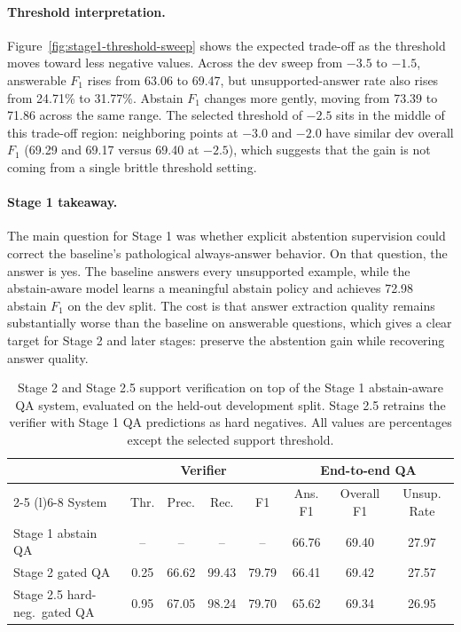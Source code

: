 \paragraph{Threshold interpretation.}
Figure~\ref{fig:stage1-threshold-sweep} shows the expected trade-off as the
threshold moves toward less negative values.
Across the dev sweep from $-3.5$ to $-1.5$, answerable $F_1$ rises from 63.06
to 69.47, but unsupported-answer rate also rises from 24.71\% to 31.77\%.
Abstain $F_1$ changes more gently, moving from 73.39 to 71.86 across the same
range.
The selected threshold of $-2.5$ sits in the middle of this trade-off region:
neighboring points at $-3.0$ and $-2.0$ have similar dev overall $F_1$
(69.29 and 69.17 versus 69.40 at $-2.5$), which suggests that the gain is not
coming from a single brittle threshold setting.

\paragraph{Stage 1 takeaway.}
The main question for Stage 1 was whether explicit abstention supervision could
correct the baseline's pathological always-answer behavior.
On that question, the answer is yes.
The baseline answers every unsupported example, while the abstain-aware model
learns a meaningful abstain policy and achieves 72.98 abstain $F_1$ on the dev
split.
The cost is that answer extraction quality remains substantially worse than the
baseline on answerable questions, which gives a clear target for Stage 2 and
later stages: preserve the abstention gain while recovering answer quality.

\begin{table}[t]
  \centering
  \caption{Stage 2 and Stage 2.5 support verification on top of the Stage 1
  abstain-aware QA system, evaluated on the held-out development split.
  Stage 2.5 retrains the verifier with Stage 1 QA predictions as hard
  negatives. All values are percentages except the selected support threshold.}
  \label{tab:stage2-main-results}
  \footnotesize
  \renewcommand{\arraystretch}{1.1}
  \setlength{\tabcolsep}{6pt}
  \begin{tabular}{@{}lccccccc@{}}
      \toprule
      & \multicolumn{4}{c}{Verifier} & \multicolumn{3}{c}{End-to-end QA} \\
      \cmidrule(lr){2-5} \cmidrule(l){6-8}
      System & Thr. & Prec. & Rec. & F1 & Ans. F1 & Overall F1 & Unsup. Rate \\
      \midrule
      Stage 1 abstain QA & -- & -- & -- & -- & 66.76 & 69.40 & 27.97 \\
      Stage 2 gated QA & 0.25 & 66.62 & 99.43 & 79.79 & 66.41 & 69.42 & 27.57 \\
      Stage 2.5 hard-neg.\ gated QA & 0.95 & 67.05 & 98.24 & 79.70 & 65.62 & 69.34 & 26.95 \\
      \bottomrule
    \end{tabular}
\end{table}

